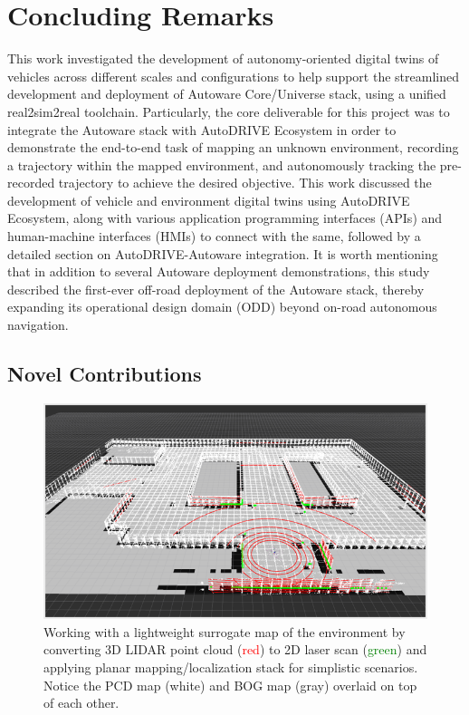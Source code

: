 \hypertarget{Concluding Remarks}{%
\section{Concluding Remarks}\label{Concluding Remarks}}

This work investigated the development of autonomy-oriented digital twins of vehicles across different scales and configurations to help support the streamlined development and deployment of Autoware Core/Universe stack, using a unified real2sim2real toolchain. Particularly, the core deliverable for this project was to integrate the Autoware stack with AutoDRIVE Ecosystem in order to demonstrate the end-to-end task of mapping an unknown environment, recording a trajectory within the mapped environment, and autonomously tracking the pre-recorded trajectory to achieve the desired objective. This work discussed the development of vehicle and environment digital twins using AutoDRIVE Ecosystem, along with various application programming interfaces (APIs) and human-machine interfaces (HMIs) to connect with the same, followed by a detailed section on AutoDRIVE-Autoware integration. It is worth mentioning that in addition to several Autoware deployment demonstrations, this study described the first-ever off-road deployment of the Autoware stack, thereby expanding its operational design domain (ODD) beyond on-road autonomous navigation.

\hypertarget{Novel Contributions}{%
\subsection{Novel Contributions}\label{Novel Contributions}}

\begin{figure}[t]
    \centering
    \includegraphics[width=\linewidth]{Figures/fig37.png}
    \caption{Working with a lightweight surrogate map of the environment by converting 3D LIDAR point cloud (\textcolor{red}{red}) to 2D laser scan (\textcolor{green}{green}) and applying planar mapping/localization stack for simplistic scenarios. Notice the PCD map (\textcolor{black!25}{white}) and BOG map (\textcolor{black!75}{gray}) overlaid on top of each other.}
    \label{fig: figure37}
\end{figure}

